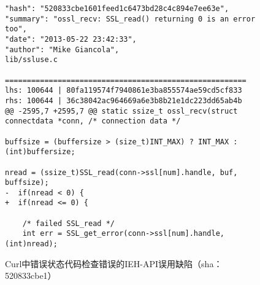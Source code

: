 \begin{figure}[t]
	\centering
\begin{lstlisting}
"hash": "520833cbe1601feed1c6473bd28c4c894e7ee63e",
"summary": "ossl_recv: SSL_read() returning 0 is an error too",
"date": "2013-05-22 23:42:33",
"author": "Mike Giancola",
lib/ssluse.c

=======================================================
lhs: 100644 | 80fa119574f7940861e3ba855574ae59cd5cf833
rhs: 100644 | 36c38042ac964669a6e3b8b21e1dc223dd65ab4b
@@ -2595,7 +2595,7 @@ static ssize_t ossl_recv(struct connectdata *conn, /* connection data */

buffsize = (buffersize > (size_t)INT_MAX) ? INT_MAX : (int)buffersize;

nread = (ssize_t)SSL_read(conn->ssl[num].handle, buf, buffsize);
-  if(nread < 0) {
+  if(nread <= 0) {

	/* failed SSL_read */
	int err = SSL_get_error(conn->ssl[num].handle, (int)nread);

\end{lstlisting}
	\caption{
	Curl中错误状态代码检查错误的IEH-API误用缺陷（sha：520833cbe1）
	}
	\label{fig:2-3-ieh-2}
\end{figure}